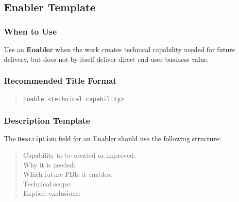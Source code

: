 \documentclass[11pt,a4paper]{article}
\begin{document}
\subsection{Enabler Template}

\subsubsection*{When to Use}
Use an \textbf{Enabler} when the work creates technical capability needed for future delivery, but does not by itself deliver direct end-user business value.

\subsubsection*{Recommended Title Format}
\begin{quote}
\texttt{Enable <technical capability>}
\end{quote}

\subsubsection*{Description Template}
The \texttt{Description} field for an Enabler should use the following structure:
\begin{quote}
Capability to be created or improved: \\
Why it is needed: \\
Which future PBIs it enables: \\
Technical scope: \\
Explicit exclusions:
\end{quote}
\end{document}

